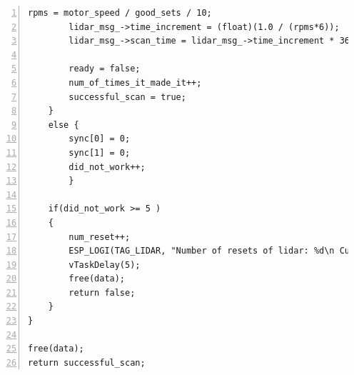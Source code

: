 \documentclass[conference]{IEEEtran}
\begin{document}
\begin{lstlisting}[frame=leftline, breaklines=true, numbers=left, stepnumber=1, numbersep=5pt]
        rpms = motor_speed / good_sets / 10;
        lidar_msg_->time_increment = (float)(1.0 / (rpms*6));
        lidar_msg_->scan_time = lidar_msg_->time_increment * 360;

        ready = false;
        num_of_times_it_made_it++;
        successful_scan = true;
    }  
    else {
        sync[0] = 0;
        sync[1] = 0;
        did_not_work++;
        }

    if(did_not_work >= 5 )
    {
        num_reset++;
        ESP_LOGI(TAG_LIDAR, "Number of resets of lidar: %d\n Current value of conversions: %d", num_reset, num_of_times_it_made_it);
        vTaskDelay(5);
        free(data);
        return false;                      
    }
}

free(data);
return successful_scan;

\end{lstlisting}

\nocite{*}

\vspace{12pt}
\end{document}
